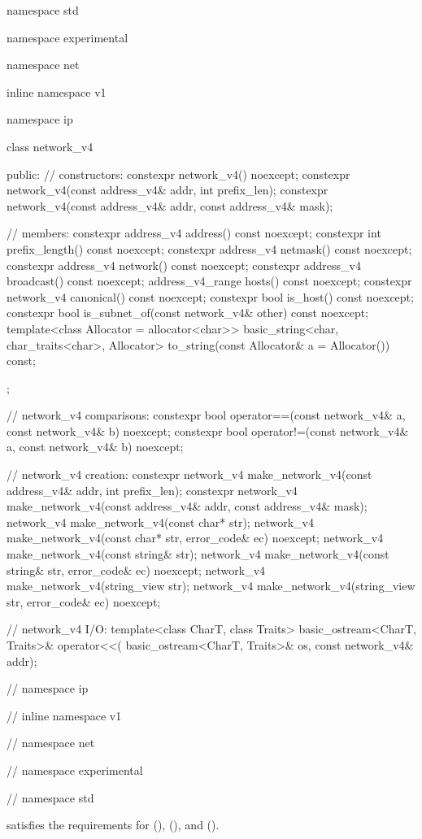 \begin{codeblock}
namespace std {
namespace experimental {
namespace net {
inline namespace v1 {
namespace ip {

  class network_v4
  {
  public:
    // constructors:
    constexpr network_v4() noexcept;
    constexpr network_v4(const address_v4& addr, int prefix_len);
    constexpr network_v4(const address_v4& addr, const address_v4& mask);

    // members:
    constexpr address_v4 address() const noexcept;
    constexpr int prefix_length() const noexcept;
    constexpr address_v4 netmask() const noexcept;
    constexpr address_v4 network() const noexcept;
    constexpr address_v4 broadcast() const noexcept;
    address_v4_range hosts() const noexcept;
    constexpr network_v4 canonical() const noexcept;
    constexpr bool is_host() const noexcept;
    constexpr bool is_subnet_of(const network_v4& other) const noexcept;
    template<class Allocator = allocator<char>>
      basic_string<char, char_traits<char>, Allocator>
        to_string(const Allocator& a = Allocator()) const;
  };

  // network_v4 comparisons:
  constexpr bool operator==(const network_v4& a, const network_v4& b) noexcept;
  constexpr bool operator!=(const network_v4& a, const network_v4& b) noexcept;

  // network_v4 creation:
  constexpr network_v4 make_network_v4(const address_v4& addr, int prefix_len);
  constexpr network_v4 make_network_v4(const address_v4& addr, const address_v4& mask);
  network_v4 make_network_v4(const char* str);
  network_v4 make_network_v4(const char* str, error_code& ec) noexcept;
  network_v4 make_network_v4(const string& str);
  network_v4 make_network_v4(const string& str, error_code& ec) noexcept;
  network_v4 make_network_v4(string_view str);
  network_v4 make_network_v4(string_view str, error_code& ec) noexcept;

  // network_v4 I/O:
  template<class CharT, class Traits>
    basic_ostream<CharT, Traits>& operator<<(
      basic_ostream<CharT, Traits>& os, const network_v4& addr);

} // namespace ip
} // inline namespace v1
} // namespace net
} // namespace experimental
} // namespace std
\end{codeblock}

\pnum
{} satisfies the requirements for  (),  (), and  ().


